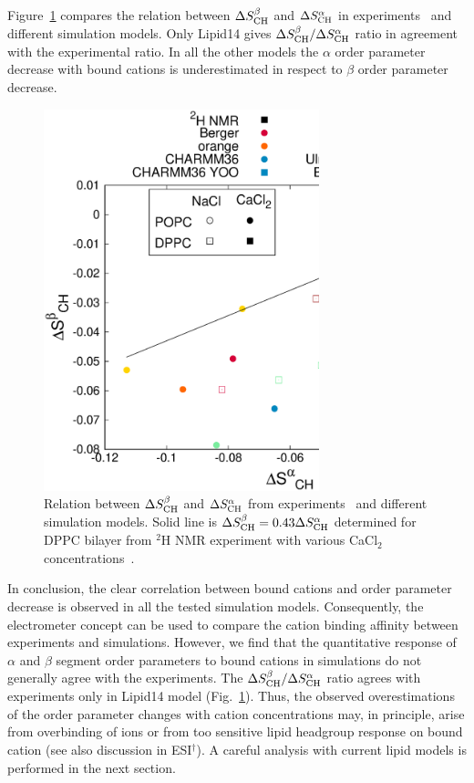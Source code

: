 \documentclass[twoside,twocolumn,9pt]{article}
\begin{document}
Figure~\ref{AvsB} compares the relation between $\Delta S_{\rm{CH}}^{\beta}$ and $\Delta S_{\rm{CH}}^{\alpha}$
in experiments~\cite{akutsu81} and different simulation models.
Only Lipid14 gives $\Delta S_{\rm{CH}}^{\beta}/\Delta S_{\rm{CH}}^{\alpha}$ ratio in agreement with the experimental ratio.
In all the other models the $\alpha$ order parameter decrease with bound cations is underestimated in
respect to $\beta$ order parameter decrease.
\begin{figure}[t]
  \centering
  \includegraphics[width=8cm]{../Fig/OrderParameterAvsB.eps}
  \caption{\label{AvsB}
    Relation between $\Delta S_{\rm{CH}}^{\beta}$ and $\Delta S_{\rm{CH}}^{\alpha}$ from experiments~\cite{akutsu81} and
    different simulation models. Solid line is $\Delta S_{\rm{CH}}^{\beta}=0.43\Delta S_{\rm{CH}}^{\alpha}$ determined for DPPC bilayer
    from $^2$H NMR experiment with various CaCl$_2$ concentrations~\cite{akutsu81}.
  }
\end{figure}




In conclusion, the clear correlation between bound cations and order parameter decrease 
is observed in all the tested simulation models. Consequently, the electrometer concept can 
be used to compare the cation binding affinity between experiments and simulations. 
However, we find that the quantitative response of $\alpha$ and $\beta$ segment order parameters to bound cations in simulations 
do not generally agree with the experiments. The $\Delta S_{\rm{CH}}^{\beta}/\Delta S_{\rm{CH}}^{\alpha}$ ratio  
agrees with experiments only in Lipid14 model (Fig.~\ref{AvsB}). 
Thus, the observed overestimations of the order parameter changes with cation concentrations may, in principle, arise
from overbinding of ions or from too sensitive lipid headgroup response on bound cation 
(see also discussion in ESI$^\dag$). 
A careful analysis with current lipid models is performed in the next section.
\end{document}
